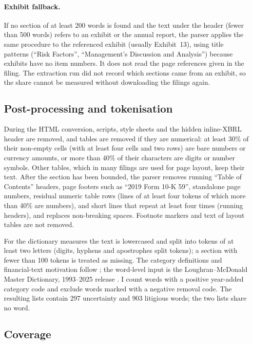 \paragraph{Exhibit fallback.} If no section of at least 200 words is found
and the text under the header (fewer than 500 words) refers to an exhibit or
the annual report, the parser applies the same procedure to the referenced
exhibit (usually Exhibit~13), using title patterns (``Risk Factors'',
``Management's Discussion and Analysis'') because exhibits have no item
numbers. It does not read the page references given in the filing. The
extraction run did not record which sections came from an exhibit, so the
share cannot be measured without downloading the filings again.

\subsection{Post-processing and tokenisation}
\label{ssec:text_postprocessing}

During the HTML conversion, scripts, style sheets and the hidden inline-XBRL
header are removed, and tables are removed if they are numerical: at least
30\% of their non-empty cells (with at least four cells and two rows) are
bare numbers or currency amounts, or more than 40\% of their characters are
digits or number symbols. Other tables, which in many filings are used for
page layout, keep their text. After the section has been bounded, the parser
removes running ``Table of Contents'' headers, page footers such as ``2019
Form 10-K 59'', standalone page numbers, residual numeric table rows (lines
of at least four tokens of which more than 40\% are numbers), and short lines
that repeat at least four times (running headers), and replaces non-breaking
spaces. Footnote markers and text of layout tables are not removed.

For the dictionary measures the text is lowercased and split into tokens of
at least two letters (digits, hyphens and apostrophes split tokens); a
section with fewer than 100 tokens is treated as missing. The category
definitions and financial-text motivation follow \textcite{loughran2011}; the
word-level input is the Loughran--McDonald Master Dictionary, 1993--2025
release \parencite{loughran_mcdonald_2025}. I count words with a positive
year-added category code and exclude words marked with a negative removal
code. The resulting lists contain 297 uncertainty and 903 litigious words;
the two lists share no word.

\subsection{Coverage}
\label{ssec:text_coverage}

